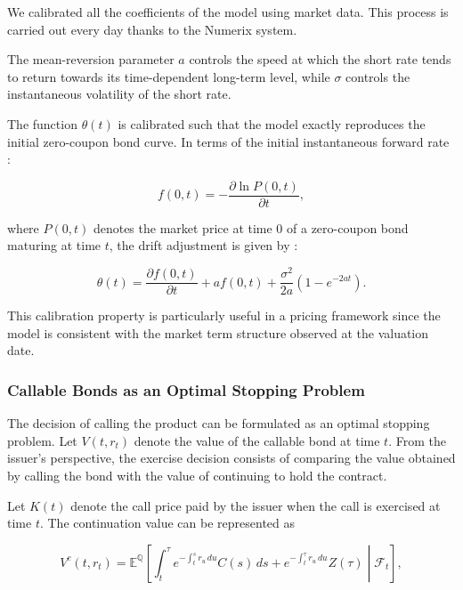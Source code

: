 \documentclass{article}
\begin{document}
We calibrated all the coefficients of the model using market data. This process is carried out every day thanks to the Numerix system.

The mean-reversion parameter $a$ controls the speed at which the
short rate tends to return towards its time-dependent long-term
level, while $\sigma$ controls the instantaneous volatility of the
short rate.

The function $\theta(t)$ is calibrated such that the model exactly
reproduces the initial zero-coupon bond curve. In terms of the
initial instantaneous forward rate :

\begin{equation}
    f(0,t)
    =
    -\frac{\partial \ln P(0,t)}{\partial t},
\end{equation}

where $P(0,t)$ denotes the market price at time 0 of a zero-coupon bond maturing at time $t$, the drift adjustment is given by : 

\begin{equation}
    \theta(t)
    =
    \frac{\partial f(0,t)}{\partial t}
    +
    a f(0,t)
    +
    \frac{\sigma^2}{2a}
    \left(
        1-e^{-2at}
    \right).
\end{equation}

This calibration property is particularly useful in a pricing
framework since the model is consistent with the market term
structure observed at the valuation date.



\subsubsection{Callable Bonds as an Optimal Stopping Problem}


The decision of calling the product can be formulated as an optimal stopping problem. Let $V(t,r_t)$ denote the value of the callable bond at time $t$. From the issuer's perspective, the exercise decision consists of comparing the value obtained by calling the bond with the value of continuing to hold the contract.

Let $K(t)$ denote the call price paid by the issuer when the call is
exercised at time $t$. The continuation value can be represented as

\begin{equation}
V^c(t,r_t)
=
\mathbb{E}^{\mathbb{Q}}
\left[
\int_t^{\tau}
e^{-\int_t^s r_u\,du}
C(s)\,ds
+
e^{-\int_t^\tau r_u\,du}
Z(\tau)
\middle|
\mathcal{F}_t
\right],
\end{equation}
\end{document}
